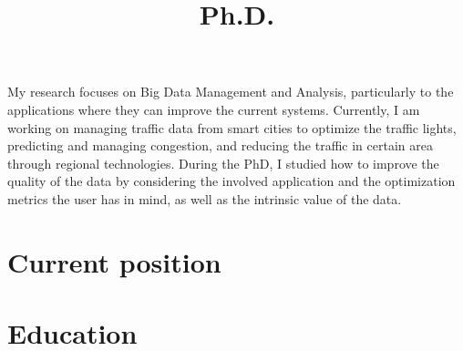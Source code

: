 \documentclass[10pt,a4paper,colorlinks,linkcolor=true]{moderncv}
\title{Ph.D.}
\begin{document}
\hypersetup{urlcolor=color1}

\makecvtitle
\pagestyle{empty} %
\setlength{\parskip}{0.4ex}

\vspace*{-5mm}

My research focuses on Big Data Management and Analysis, particularly to the applications where they can improve the current systems.
Currently, I am working on managing traffic data from smart cities to optimize the traffic lights, predicting and managing congestion, and reducing the traffic in certain area through regional technologies.
During the PhD, I studied how to improve the quality of the data by considering the involved application and the optimization metrics the user has in mind, as well as the intrinsic value of the data.


\section{Current position}



\section{Education}
\end{document}
